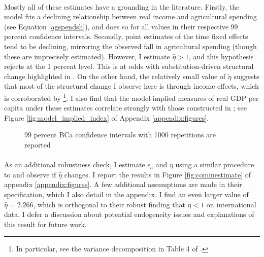 \documentclass[]{article}
\theoremstyle{plain}
\begin{document}
\paragraph*{}
Mostly all of these estimates have a grounding in the literature. Firstly, the model fits a declining relationship between real income and agricultural spending (see Equation \ref{agspendsh}), and does so for all values in their respective 99 percent confidence intervals. Secondly, point estimates of the time fixed effects tend to be declining, mirroring the observed fall in agricultural spending (though these are imprecisely estimated). However, I estimate $\hat{\eta} > 1$, and this hypothesis rejects at the 1 percent level. This is at odds with substitution-driven structural change highlighted in \cite{ngaipissa}. On the other hand, the relatively small value of $\tilde{\eta}$ suggests that most of the structural change I observe here is through income effects, which is corroborated by \cite{cominetal2021}\footnote{In particular, see the variance decomposition in Table 4 of \cite{cominetal2021}.}. I also find that the model-implied measures of real GDP per capita under these estimates correlate strongly with those constructed in \cite{tombezhu}; see Figure \ref{fig:model_implied_index} of Appendix \ref{appendix:figures}. 
	\begin{figure}[h]
		\small	
		\centering	
	\caption{99 percent BCa confidence intervals with 1000 repetitions are reported}
	\label{fig:estimationresults}
\end{figure}
\paragraph*{}
As an additional robustness check, I estimate $\epsilon_{a}$ and $\eta$ using a similar procedure to \cite{cominetal2021} and observe if $\hat{\eta}$ changes. I report the results in Figure \ref{fig:cominestimate}  of appendix \ref{appendix:figures}. A few additional assumptions are made in their specification, which I also detail in the appendix. I find an even larger value of $\hat{\eta} = 2.266$, which is orthogonal to their robust finding that $\eta < 1$ on international data. I defer a discussion about potential endogeneity issues and explanations of this result for future work.  
\end{document}

